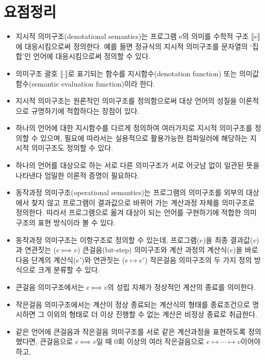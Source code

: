 \section*{요점정리}
\begin{itemize}
 \item 지시적 의미구조(denotational semantics)는 프로그램 e의 의미를
       수학적 구조 $\llbracket e\rrbracket$에 대응시킴으로써 정의한다.
       예를 들면 정규식의 지시적 의미구조를 문자열의 `집합'인 언어에
       대응시킴으로써 정의할 수 있다.
 \item 의미구조 괄호 $\llbracket \cdot \rrbracket$로 표기되는
       함수를 지시함수(denotation function) 또는
       의미값함수(semantic evaluation function)이라 한다.
 \item 지시적 의미구조는 원론적인 의미구조를 정의함으로써 대상 언어의
       성질을 이론적으로 규명하기에 적합하다는 장점이 있다.
 \item 하나의 언어에 대한 지시함수를 다르게 정의하여 여러가지로
       지시적 의미구조를 정의할 수 있으며, 필요에 따라서는 실용적으로
       활용가능한 컴파일러에 해당하는 지시적 의미구조도 정의할 수 있다.
 \item 하나의 언어를 대상으로 하는 서로 다른 의미구조가 서로 어긋남
       없이 일관된 뜻을 나타낸다 엄밀한 이론적 증명이 필요하다.
 \item 동작과정 의미구조(operational semantics)는 프로그램의 의미구조를
       외부의 대상에서 찾지 않고 프로그램이 결과값으로 바뀌어 가는
       계산과정 자체를 의미구조로 정의한다. 따라서 프로그램으로 옮겨
       대상이 되는 언어를 구현하기에 적합한 의미구조의 표현 방식이라 볼 수 있다.
 \item 동작과정 의미구조는 이항구조로 정의할 수 있는데,
       프로그램($e$)을 최종 결과값($v$)과 연관짓는 ($e\Longmapsto v$)
       큰걸음(bit-step) 의미구조와 계산 과정의 계산식($e$)을 바로
       다음 단계의 계산식($e'$)와 연관짓는 ($e\longmapsto e'$)
       작은걸음 의미구조의 두 가지 정의 방식으로 크게 분류할 수 있다.
 \item 큰걸음 의미구조에서는 $e\Longmapsto v$의 성립 자체가 정상적인
       계산의 종료를 의미한다.
 \item 작은걸음 의미구조에서는 계산이 정상 종료되는 계산식의 형태를
       종료조건으로 명시하면 그 이외의 형태로 더 이상 진행할 수 없는
       계산은 비정상 종료로 취급한다.
 \item 같은 언어에 큰걸음과 작은걸음 의미구조를 서로 같은 계산과정을
       표현하도록 정의했다면, 큰걸음으로 $e\Longmapsto v$일 때
       0회 이상의 여러 작은걸음으로 $e\longmapsto \cdots \longmapsto v$이어야 하고,

\end{itemize}

